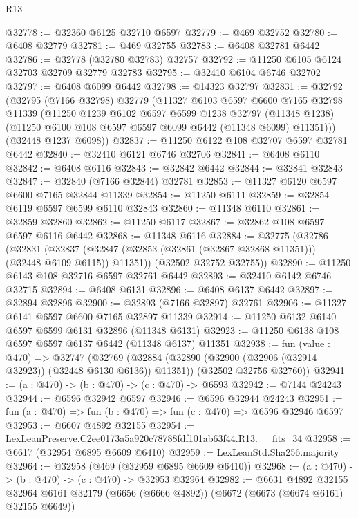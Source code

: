 \begin{lexlean}{R13}
\begin{coremodule}
@32778 := @32360 @6125 @32710 @6597
@32779 := @469 @32752
@32780 := @6408 @32779
@32781 := @469 @32755
@32783 := @6408 @32781 @6442
@32786 := @32778 (@32780 @32783) @32757
@32792 := @11250 @6105 @6124 @32703 @32709 @32779 @32783
@32795 := @32410 @6104 @6746 @32702
@32797 := @6408 @6099 @6442
@32798 := @14323 @32797
@32831 := @32792
    (@32795
      (@7166 @32798)
      @32779
      (@11327
        @6103
        @6597
        @6600
        @7165
        @32798
        @11339
        (@11250
          @1239
          @6102
          @6597
          @6599
          @1238
          @32797
          (@11348 @1238)
          (@11250 @6100 @108 @6597 @6597 @6099 @6442 (@11348 @6099) @11351)))
      (@32448 @1237 @6098))
@32837 := @11250 @6122 @108 @32707 @6597 @32781 @6442
@32840 := @32410 @6121 @6746 @32706
@32841 := @6408 @6110
@32842 := @6408 @6116
@32843 := @32842 @6442
@32844 := @32841 @32843
@32847 := @32840 (@7166 @32844) @32781
@32853 := @11327 @6120 @6597 @6600 @7165 @32844 @11339
@32854 := @11250 @6111
@32859 := @32854 @6119 @6597 @6599 @6110 @32843
@32860 := @11348 @6110
@32861 := @32859 @32860
@32862 := @11250 @6117
@32867 := @32862 @108 @6597 @6597 @6116 @6442
@32868 := @11348 @6116
@32884 := @32775
    (@32786
      (@32831
        (@32837 (@32847 (@32853 (@32861 (@32867 @32868 @11351))) (@32448 @6109 @6115)) @11351))
      (@32502 @32752 @32755))
@32890 := @11250 @6143 @108 @32716 @6597 @32761 @6442
@32893 := @32410 @6142 @6746 @32715
@32894 := @6408 @6131
@32896 := @6408 @6137 @6442
@32897 := @32894 @32896
@32900 := @32893 (@7166 @32897) @32761
@32906 := @11327 @6141 @6597 @6600 @7165 @32897 @11339
@32914 := @11250 @6132 @6140 @6597 @6599 @6131 @32896 (@11348 @6131)
@32923 := @11250 @6138 @108 @6597 @6597 @6137 @6442 (@11348 @6137) @11351
@32938 := fun (value : @470) =>
  @32747
    (@32769
      (@32884 (@32890 (@32900 (@32906 (@32914 @32923)) (@32448 @6130 @6136)) @11351))
      (@32502 @32756 @32760))
@32941 := (a : @470) -> (b : @470) -> (c : @470) -> @6593
@32942 := @7144 @24243
@32944 := @6596 @32942 @6597
@32946 := @6596 @32944 @24243
@32951 := fun (a : @470) => fun (b : @470) => fun (c : @470) => @6596 @32946 @6597
@32953 := @6607 @4892 @32155
@32954 := LexLeanPreserve.C2ee0173a5a920c78788fdf101ab63f44.R13.__fits_34
@32958 := @6617 (@32954 @6895 @6609 @6410)
@32959 := LexLeanStd.Sha256.majority
@32964 := @32958 (@469 (@32959 @6895 @6609 @6410))
@32968 := (a : @470) -> (b : @470) -> (c : @470) -> @32953 @32964
@32982 := @6631
    @4892
    @32155
    @32964
    @6161
    @32179
    (@6656 (@6666 @4892))
    (@6672 (@6673 (@6674 @6161) @32155 @6649))

\end{coremodule}
\end{lexlean}
